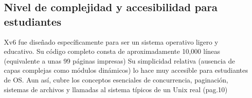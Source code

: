 
\subsection{Nivel de complejidad y accesibilidad para estudiantes}
Xv6 fue diseñado específicamente para ser un sistema operativo ligero y educativo. Su código completo consta de aproximadamente 10,000 líneas (equivalente a unas 99 páginas impresas)
Su simplicidad relativa (ausencia de capas complejas como módulos dinámicos) lo hace muy accesible para estudiantes de OS. Aun así, cubre los conceptos esenciales de concurrencia, paginación, sistemas de archivos y llamadas al sistema típicos de un Unix real\citep{xv6_mit} (pag.10)